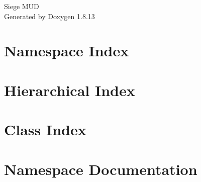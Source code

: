 \documentclass[twoside]{book}
\newcommand{\+}{\discretionary{\mbox{\scriptsize$\hookleftarrow$}}{}{}}
\newcommand{\clearemptydoublepage}{%
  \newpage{\pagestyle{empty}\cleardoublepage}%
}
\begin{document}
\hypersetup{pageanchor=false,
             bookmarksnumbered=true,
             pdfencoding=unicode
            }
\begin{titlepage}
\vspace*{7cm}
\begin{center}%
{\Large Siege M\+UD }\\
\vspace*{1cm}
{\large Generated by Doxygen 1.8.13}\\
\end{center}
\end{titlepage}
\clearemptydoublepage
{}
\tableofcontents
\clearemptydoublepage
{}
\hypersetup{pageanchor=true}

\chapter{Namespace Index}

\chapter{Hierarchical Index}

\chapter{Class Index}

\chapter{Namespace Documentation}














\end{document}
